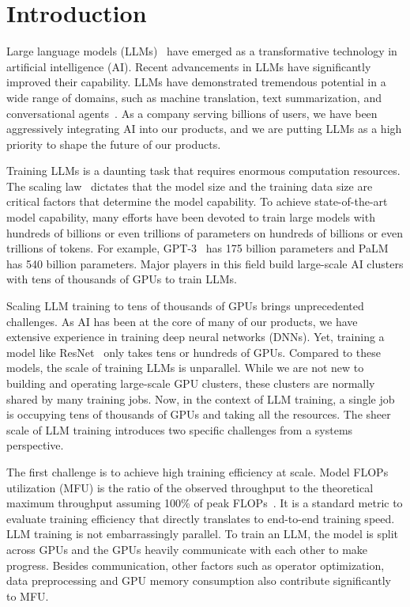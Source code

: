 \section{Introduction}
\label{sec:introduction}

Large language models (LLMs)~\cite{brown2020language} have emerged as a transformative
technology in artificial intelligence (AI). Recent advancements in LLMs have
significantly improved their capability. LLMs have demonstrated tremendous
potential in a wide range of domains, such as machine translation, text
summarization, and conversational agents~\cite{chatgpt}. As a company serving billions
of users, we have been aggressively integrating AI into our products, and we are
putting LLMs as a high priority to shape the future of our products.

Training LLMs is a daunting task that requires enormous computation resources.
The scaling law~\cite{kaplan2020scaling} dictates that the model size and the
training data size are critical factors that determine the model capability. To
achieve state-of-the-art model capability, many efforts have been devoted to
train large models with hundreds of billions or even trillions of parameters on
hundreds of billions or even trillions of tokens. For example, GPT-3~\cite{floridi2020gpt}
has 175 billion parameters and PaLM~\cite{chowdhery2022palm} has 540 billion parameters. Major
players in this field build large-scale AI clusters with tens of thousands of
GPUs to train LLMs.


Scaling LLM training to tens of thousands of GPUs brings unprecedented
challenges. As AI has been at the core of many of our products, we have extensive
experience in training deep neural networks (DNNs). Yet, training a model like
ResNet~\cite{he2016deep} only takes tens or hundreds of GPUs.
Compared to these models,
the scale of training LLMs
is unparallel. While we are not new to building and operating
large-scale GPU clusters, these clusters are normally shared by many training
jobs. Now, in the context of LLM training, a single job is occupying tens of
thousands of GPUs and taking all the resources. The sheer scale of
LLM training introduces two specific challenges from a systems perspective.

The first challenge is to achieve high training efficiency at scale. Model FLOPs
utilization (MFU) is the ratio of the observed throughput to the theoretical
maximum throughput assuming 100\% of peak FLOPs~\cite{narayanan2021efficient}.
It is a standard metric to evaluate training efficiency that directly translates
to end-to-end training speed. LLM training is not embarrassingly parallel. To
train an LLM, the model is split across GPUs and the GPUs heavily communicate
with each other to make progress. Besides communication, other factors such as
operator optimization, data preprocessing and GPU memory consumption also
contribute significantly to MFU.

